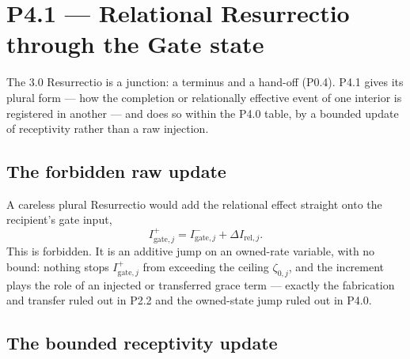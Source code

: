 \documentclass[11pt,a4paper]{article}
\theoremstyle{definition}
\theoremstyle{plain}
\theoremstyle{remark}
\begin{document}
\section{P4.1 --- Relational Resurrectio through the Gate state}

The 3.0 Resurrectio is a junction: a terminus and a hand-off (P0.4). P4.1 gives its plural
form --- how the completion or relationally effective event of one interior is registered in
another --- and does so within the P4.0 table, by a bounded update of receptivity rather than
a raw injection.

\subsection{The forbidden raw update}

A careless plural Resurrectio would add the relational effect straight onto the recipient's
gate input,
\[
I_{\mathrm{gate},j}^{+}
=
I_{\mathrm{gate},j}^{-}
+
\Delta I_{\mathrm{rel},j}.
\]
This is forbidden. It is an additive jump on an owned-rate variable, with no bound: nothing
stops \(I_{\mathrm{gate},j}^{+}\) from exceeding the ceiling \(\zeta_{0,j}\), and the
increment plays the role of an injected or transferred grace term --- exactly the
fabrication and transfer ruled out in P2.2 and the owned-state jump ruled out in P4.0.

\subsection{The bounded receptivity update}
\end{document}
